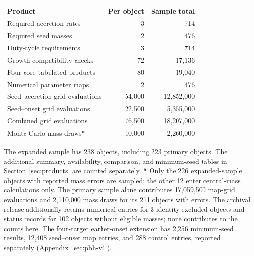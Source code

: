 \documentclass[pdflatex,sn-basic]{sn-jnl}
\begin{document}
\par\bigskip
\noindent\begin{minipage}{\textwidth}
\centering
{}
\begin{tabular}{@{}>{\raggedright\arraybackslash}p{}rr@{}}
\toprule
Product & Per object & Sample total \\
\midrule
Required accretion rates & 3 & 714 \\
Required seed masses & 2 & 476 \\
Duty-cycle requirements & 3 & 714 \\
Growth compatibility checks & 72 & 17,136 \\
Four core tabulated products & 80 & 19,040 \\
Numerical parameter maps & 2 & 476 \\
Seed--accretion grid evaluations & 54,000 & 12,852,000 \\
Seed--onset grid evaluations & 22,500 & 5,355,000 \\
Combined grid evaluations & 76,500 & 18,207,000 \\
Monte Carlo mass draws$^{\rm a}$ & 10,000 & 2,260,000 \\
\bottomrule
\end{tabular}
\par\smallskip
\parbox{\textwidth}{\footnotesize
The expanded sample has 238 objects, including 223 primary objects.
The additional summary, availability, comparison, and minimum-seed tables
in Section~\ref{sec:products} are counted separately.
$^{\rm a}$ Only the 226 expanded-sample objects with reported mass errors are
sampled; the other 12 enter central-mass calculations only. The primary
sample alone contributes 17,059,500 map-grid evaluations and 2,110,000 mass
draws for its 211 objects with errors. The archival release additionally
retains numerical entries for 3 identity-excluded objects and status records
for 102 objects without eligible masses; none contributes to the counts here.
The four-target earlier-onset extension has 2,256 minimum-seed results,
12,408 seed--onset map entries, and 288 control entries, reported separately
(Appendix~\ref{sec:pbh-v4}).}
\label{tab:products}
\end{minipage}
\end{document}
